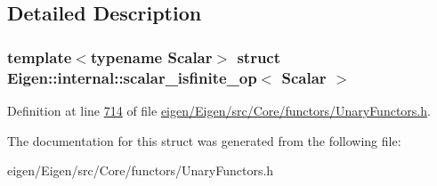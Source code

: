 \subsection{Detailed Description}
\subsubsection*{template$<$typename Scalar$>$\newline
struct Eigen\+::internal\+::scalar\+\_\+isfinite\+\_\+op$<$ Scalar $>$}



Definition at line \hyperlink{eigen_2_eigen_2src_2_core_2functors_2_unary_functors_8h_source_l00714}{714} of file \hyperlink{eigen_2_eigen_2src_2_core_2functors_2_unary_functors_8h_source}{eigen/\+Eigen/src/\+Core/functors/\+Unary\+Functors.\+h}.



The documentation for this struct was generated from the following file\+:\begin{DoxyCompactItemize}
\item 
eigen/\+Eigen/src/\+Core/functors/\+Unary\+Functors.\+h\end{DoxyCompactItemize}
